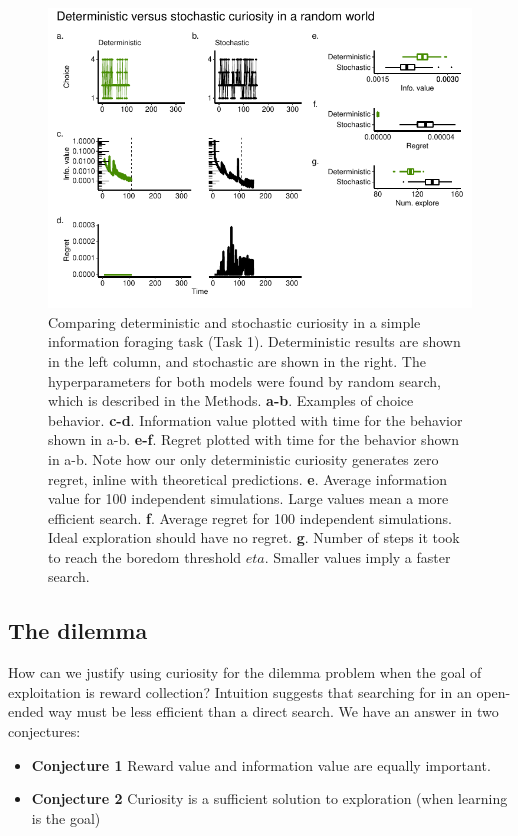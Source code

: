 \begin{figure}
	\begin{fullwidth}
	\includegraphics[width=.6\linewidth]{img/curiosity1.pdf} 
	\caption{Comparing deterministic and stochastic curiosity in a simple information foraging task (Task 1). Deterministic results are shown in the left column, and stochastic are shown in the right. The hyperparameters for both models were found by random search, which is described in the Methods.
	\textbf{a-b}. Examples of choice behavior.
	\textbf{c-d}. Information value plotted with time for the behavior shown in a-b.
	\textbf{e-f}. Regret plotted with time for the behavior shown in a-b. Note how our only deterministic curiosity generates zero regret, inline with theoretical predictions.
	\textbf{e}. Average information value for 100 independent simulations. Large values mean a more efficient search.
	\textbf{f}. Average regret for 100 independent simulations. Ideal exploration should have no regret. 
	\textbf{g}. Number of steps it took to reach the boredom threshold $eta$. Smaller values imply a faster search.
	}
	\label{fig:curiosity1} 
	\end{fullwidth}
\end{figure}

\subsection{The dilemma}
How can we justify using curiosity for the dilemma problem when the goal of exploitation is reward collection? Intuition suggests that searching for in an open-ended way must be less efficient than a direct search. We have an answer in two conjectures:

\begin{itemize}
	\item \textbf{Conjecture 1} Reward value and information value are equally important.
	\item \textbf{Conjecture 2} Curiosity is a sufficient solution to exploration (when learning is the goal)
\end{itemize}

